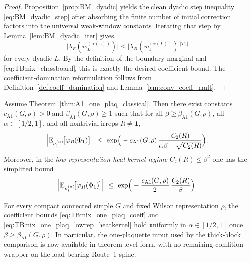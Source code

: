 \begin{proof}
Proposition~\ref{prop:BM_dyadic} yields the clean dyadic step inequality \eqref{eq:BM_dyadic_step} after absorbing the finite number of initial correction factors into the universal weak-window constants.
Iterating that step by Lemma~\ref{lem:BM_dyadic_iter} gives
\[
\big|\lambda_R(w_L^{(\alpha(L))})\big|
\le
\big|\lambda_R(w_1^{(\alpha(L))})\big|^{|T_L|}
\]
for every dyadic $L$.
By the definition of the boundary marginal and \eqref{eq:TBmix_chessboard}, this is exactly the desired coefficient bound.
The coefficient-domination reformulation follows from Definition~\ref{def:coeff_domination} and Lemma~\ref{lem:conv_coeff_mult}.
\end{proof}



\begin{proposition}\label{prop:TBmix_one_plaq_coeff_crossover}
Assume Theorem~\ref{thm:A1_one_plaq_classical}.
Then there exist constants $c_{\mathrm{A1}}(G,\rho)>0$ and $\beta_{\mathrm{A1}}(G,\rho)\ge 1$ such that for all $\beta\ge \beta_{\mathrm{A1}}(G,\rho)$,
all $\alpha\in[1/2,1]$, and all nontrivial irreps $R\neq \mathbf 1$,
\begin{equation}\label{eq:TBmix_one_plaq_coeff}
\Bigl|\mathbb E_{\nu_1^{(\alpha)}}\!\big[\varphi_R(\Phi_1)\big]\Bigr|
\ \le\
\exp\!\Big(-c_{\mathrm{A1}}(G,\rho)\,\frac{C_2(R)}{\alpha\beta+\sqrt{C_2(R)}}\Big).
\end{equation}
Moreover, in the \emph{low-representation heat-kernel regime} $C_2(R)\le \beta^2$ one has the simplified bound
\begin{equation}\label{eq:TBmix_one_plaq_lowrep_heatkernel}
\Bigl|\mathbb E_{\nu_1^{(\alpha)}}\!\big[\varphi_R(\Phi_1)\big]\Bigr|
\ \le\
\exp\!\Big(-\frac{c_{\mathrm{A1}}(G,\rho)}{2}\,\frac{C_2(R)}{\beta}\Big).
\end{equation}
\end{proposition}

\begin{corollary}\label{cor:TBmix_one_plaq_closed}
For every compact connected simple $G$ and fixed Wilson representation $\rho$, the coefficient bounds \eqref{eq:TBmix_one_plaq_coeff} and \eqref{eq:TBmix_one_plaq_lowrep_heatkernel}
hold uniformly in $\alpha\in[1/2,1]$ once $\beta\ge\beta_{\mathrm{A1}}(G,\rho)$.
In particular, the one-plaquette input used by the thick-block comparison is now available in theorem-level form, with no remaining condition wrapper on the load-bearing Route~1 spine.
\end{corollary}


